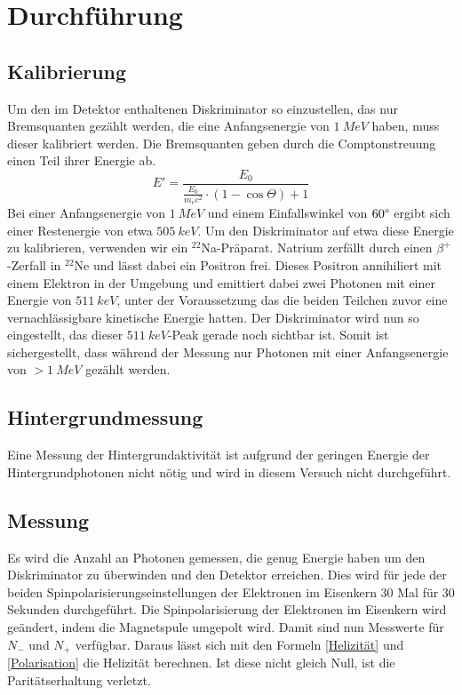 \section{Durchführung}
\subsection{Kalibrierung}
Um den im Detektor enthaltenen Diskriminator so einzustellen, das nur Bremsquanten gezählt werden, die eine Anfangsenergie von $\SI{1}{MeV}$ haben, muss dieser kalibriert werden. Die Bremsquanten geben durch die Comptonstreuung einen Teil ihrer Energie ab. 
$$E' = \frac{E_0}{\frac{E_0}{m_ec^2}\cdot(1-\cos{\Theta})+1}$$
Bei einer Anfangsenergie von $\SI{1}{MeV}$ und einem Einfallswinkel von $60\degree$ ergibt sich einer Restenergie von etwa $\SI{505}{keV}$. Um den Diskriminator auf etwa diese Energie zu kalibrieren, verwenden wir ein $^{22}$Na-Präparat. Natrium zerfällt durch einen $\beta^+$-Zerfall in $^{22}$Ne und lässt dabei ein Positron frei. Dieses Positron annihiliert mit einem Elektron in der Umgebung und emittiert dabei zwei Photonen mit einer Energie von $\SI{511}{keV}$, unter der Voraussetzung das die beiden Teilchen zuvor eine vernachlässigbare kinetische Energie hatten. Der Diskriminator wird nun so eingestellt, das dieser $\SI{511}{keV}$-Peak gerade noch sichtbar ist. Somit ist sichergestellt, dass während der Messung nur Photonen mit einer Anfangsenergie von $>\SI{1}{MeV}$ gezählt werden.
\subsection{Hintergrundmessung}
Eine Messung der Hintergrundaktivität ist aufgrund der geringen Energie der Hintergrundphotonen nicht nötig und wird in diesem Versuch nicht durchgeführt.
\subsection{Messung}
Es wird die Anzahl an Photonen gemessen, die genug Energie haben um den Diskriminator zu überwinden und den Detektor erreichen. Dies wird für jede der beiden Spinpolarisierungseinstellungen der Elektronen im Eisenkern 30 Mal für 30 Sekunden durchgeführt. Die Spinpolarisierung der Elektronen im Eisenkern wird geändert, indem die Magnetspule umgepolt wird. Damit sind nun Messwerte für $N_-$ und $N_+$ verfügbar. Daraus lässt sich mit den Formeln \ref{Helizität} und \ref{Polarisation} die Helizität berechnen. Ist diese nicht gleich Null, ist die Paritätserhaltung verletzt. 